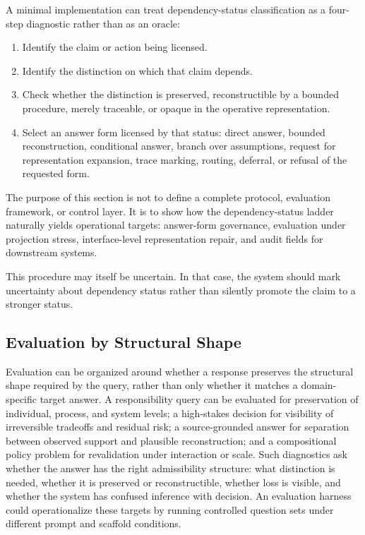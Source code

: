 \documentclass[11pt]{article}
\begin{document}
A minimal implementation can treat dependency-status classification as a four-step diagnostic rather than as an oracle:

\begin{enumerate}
    \item Identify the claim or action being licensed.
    \item Identify the distinction on which that claim depends.
    \item Check whether the distinction is preserved, reconstructible by a bounded procedure, merely traceable, or opaque in the operative representation.
    \item Select an answer form licensed by that status: direct answer, bounded reconstruction, conditional answer, branch over assumptions, request for representation expansion, trace marking, routing, deferral, or refusal of the requested form.
\end{enumerate}

The purpose of this section is not to define a complete protocol, evaluation framework, or control layer. It is to show how the dependency-status ladder naturally yields operational targets: answer-form governance, evaluation under projection stress, interface-level representation repair, and audit fields for downstream systems.

This procedure may itself be uncertain. In that case, the system should mark uncertainty about dependency status rather than silently promote the claim to a stronger status.

\subsection{Evaluation by Structural Shape}

Evaluation can be organized around whether a response preserves the structural shape required by the query, rather than only whether it matches a domain-specific target answer. A responsibility query can be evaluated for preservation of individual, process, and system levels; a high-stakes decision for visibility of irreversible tradeoffs and residual risk; a source-grounded answer for separation between observed support and plausible reconstruction; and a compositional policy problem for revalidation under interaction or scale. Such diagnostics ask whether the answer has the right admissibility structure: what distinction is needed, whether it is preserved or reconstructible, whether loss is visible, and whether the system has confused inference with decision. An evaluation harness could operationalize these targets by running controlled question sets under different prompt and scaffold conditions.
\end{document}
